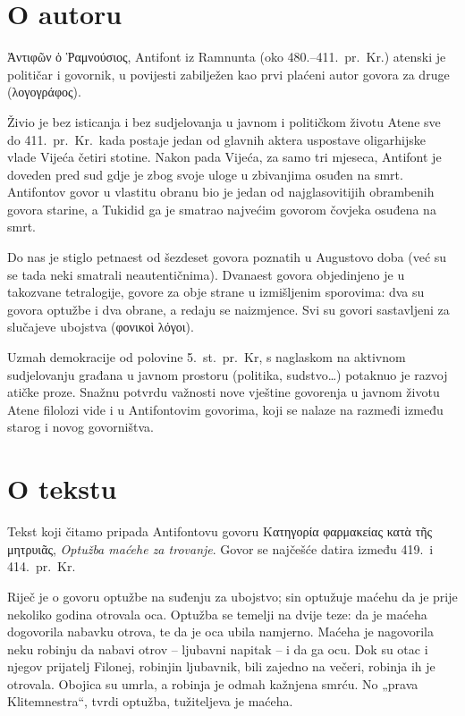 \section*{O autoru}

\textgreek[variant=ancient]{Ἀντιφῶν ὁ Ῥαμνούσιος,} Antifont iz Ramnunta (oko 480.–411.\ pr.~Kr.) atenski je političar i govornik, u povijesti zabilježen kao prvi plaćeni autor govora za druge \textgreek[variant=ancient]{(λογογράφος).}
 
Živio je bez isticanja i bez sudjelovanja u javnom i političkom životu Atene sve do 411.\ pr.~Kr.\ kada postaje jedan od glavnih aktera uspostave oligarhijske vlade Vijeća četiri stotine. Nakon pada Vijeća, za samo tri mjeseca, Antifont je doveden pred sud gdje je zbog svoje uloge u zbivanjima osuđen na smrt. Antifontov govor u vlastitu obranu bio je jedan od najglasovitijih obrambenih govora starine, a Tukidid ga je smatrao najvećim govorom čovjeka osuđena na smrt.

Do nas je stiglo petnaest od šezdeset govora poznatih u Augustovo doba (već su se tada neki smatrali neautentičnima). Dvanaest govora objedinjeno je u takozvane tetralogije, govore za obje strane u izmišljenim sporovima: dva su govora optužbe i dva obrane, a redaju se naizmjence. Svi su govori sastavljeni za slučajeve ubojstva \textgreek[variant=ancient]{(φονικοὶ λόγοι).}

Uzmah demokracije od polovine 5.~st.\ pr.~Kr, s naglaskom na aktivnom sudjelovanju građana u javnom prostoru (politika, sudstvo…) potaknuo je razvoj atičke proze. Snažnu potvrdu važnosti nove vještine govorenja u javnom životu Atene filolozi vide i u Antifontovim govorima, koji se nalaze na razmeđi između starog i novog govorništva.

\section*{O tekstu}

Tekst koji čitamo pripada Antifontovu govoru \textgreek[variant=ancient]{Κατηγορία φαρμακείας κατὰ τῆς μητρυιᾶς}, \textit{Optužba maćehe za trovanje}. Govor se najčešće datira između 419.\ i 414.\ pr.~Kr.

Riječ je o govoru optužbe na suđenju za ubojstvo; sin optužuje maćehu da je prije nekoliko godina otrovala oca. Optužba se temelji na dvije teze: da je maćeha dogovorila nabavku otrova, te da je oca ubila namjerno. Maćeha je nagovorila neku robinju da nabavi otrov – ljubavni napitak – i da ga ocu. Dok su otac i njegov  prijatelj Filonej, robinjin ljubavnik, bili zajedno na večeri, robinja ih je otrovala. Obojica su umrla, a robinja je odmah kažnjena smrću. No „prava Klitemnestra“, tvrdi optužba, tužiteljeva je maćeha.

